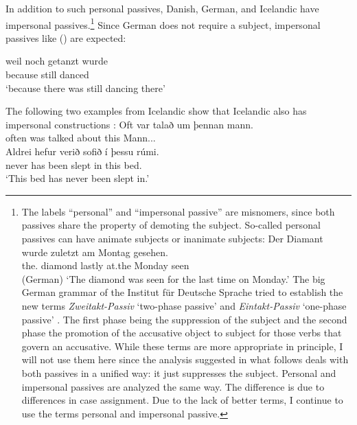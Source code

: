 \noindent
In addition to such personal passives, Danish, German, and Icelandic have impersonal
passives.\footnote{
The labels ``personal'' and ``impersonal passive'' are misnomers, since both passives share the property of
demoting the subject. So-called personal passives can have animate subjects or inanimate subjects:
\ea 
\gll Der        Diamant wurde  zuletzt am Montag gesehen.\\
     the.\NOM{} diamond \AUX{} lastly at.the Monday seen\\\hfill(German)
\glt `The diamond was seen for the last time on Monday.'
\z
The big German grammar of the Institut für Deutsche Sprache tried to establish the new terms \emph{Zweitakt-Passiv} `two-phase passive' and
\emph{Eintakt-Passiv} `one-phase passive' \citep[]{Zifonun97b}. The first phase being the suppression of the subject and
the second phase the promotion of the accusative object to subject for those verbs that govern an
accusative. While these terms are more appropriate in principle, I will not use them here since the
analysis suggested in what follows deals with both passives in a unified way: it just suppresses the
subject. Personal and impersonal passives are analyzed the same way. The difference is due to
differences in case assignment. Due to the lack of better terms, I continue to use the terms personal and
impersonal passive.
} Since German does not require a subject, impersonal passives like () are expected:

\ea
\gll weil    noch  getanzt wurde\\
     because still danced  \AUX\\\german
\glt `because there was still dancing there'
\z

The following two examples from Icelandic show that Icelandic also has impersonal constructions \citep[]{Thrainsson2007a-u}:
\eal
\ex 
\gll Oft var   talað      um   þennan mann.\\
     often was talked about this Mann.\ACC.\SG.\M\\\icelandic
\ex
\gll Aldrei hefur verið    sofið      í  þessu  rúmi.\\
     never    has   been slept in this bed.\DAT\\
\glt `This bed has never been slept in.'
\zl

